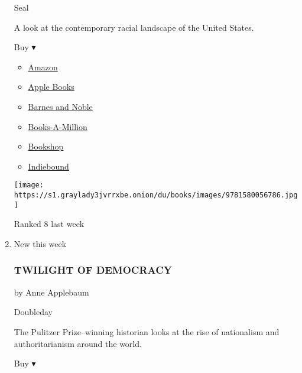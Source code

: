 \begin{enumerate}
  Seal

  A look at the contemporary racial landscape of the United States.

  Buy ▾

  \begin{itemize}
  \tightlist
  \item
    \href{https://www.amazon.com/You-Want-Talk-About-Race-ebook/dp/B073P53DVL?tag=NYTBS-20}{Amazon}
  \item
    \href{https://du-gae-books-dot-nyt-du-prd.appspot.com/buy?title=SO+YOU+WANT+TO+TALK+ABOUT+RACE\&author=Ijeoma+Oluo}{Apple
    Books}
  \item
    \href{https://www.anrdoezrs.net/click-7990613-11819508?url=https\%3A\%2F\%2Fwww.barnesandnoble.com\%2Fw\%2F\%3Fean\%3D9781580058827}{Barnes
    and Noble}
  \item
    \href{https://www.anrdoezrs.net/click-7990613-35140?url=https\%3A\%2F\%2Fwww.booksamillion.com\%2Fp\%2FSO\%2BYOU\%2BWANT\%2BTO\%2BTALK\%2BABOUT\%2BRACE\%2FIjeoma\%2BOluo\%2F9781580058827}{Books-A-Million}
  \item
    \href{https://bookshop.org/a/3546/9781580058827}{Bookshop}
  \item
    \href{https://www.indiebound.org/book/9781580058827?aff=NYT}{Indiebound}
  \end{itemize}

  \texttt{[image: https://s1.graylady3jvrrxbe.onion/du/books/images/9781580056786.jpg]}

  Ranked 8 last week
\item
  New this week

  \hypertarget{twilight-of-democracy}{%
  \subsubsection{TWILIGHT OF DEMOCRACY}\label{twilight-of-democracy}}

  by Anne Applebaum

  Doubleday

  The Pulitzer Prize--winning historian looks at the rise of nationalism
  and authoritarianism around the world.

  Buy ▾


\end{enumerate}
